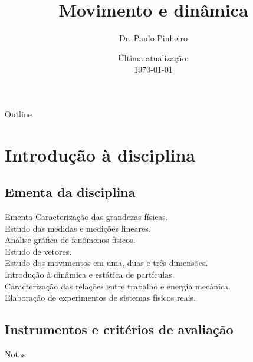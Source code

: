 \documentclass{beamer}
\title{Movimento e dinâmica}
\author[Paulo Pinheiro]
{Dr. Paulo Pinheiro\inst{1}}
\institute[UNIFAP]
{
    \inst{1}
    Centro Universitário Paraíso do Ceará\\
    UNIFAP
}
\date{Última atualização:\\ \today}
\begin{document}
\begin{frame}
    \titlepage 
\end{frame}
%
\logo{}
\begin{frame}{Outline}
    \tableofcontents
\end{frame}
\section{Introdução à disciplina}
%
\subsection{Ementa da disciplina}
%
\begin{frame}
    \begin{block}{Ementa}
        Caracterização das grandezas físicas.\\
        Estudo das medidas e medições lineares.\\ 
        Análise gráfica de fenômenos físicos. \\
        Estudo de vetores. \\
        Estudo dos movimentos em uma, duas e três dimensões. \\
        Introdução à dinâmica e estática de partículas. \\
        Caracterização das relações entre trabalho e energia mecânica. \\
        Elaboração de experimentos de sistemas físicos reais.
    \end{block}
\end{frame}
%
\subsection{Instrumentos e critérios de avaliação}
%
\begin{frame}{Notas}
    
\end{frame}
%
\end{document}
